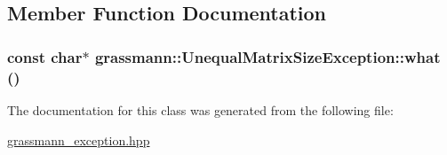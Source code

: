 \subsection{Member Function Documentation}
\hypertarget{classgrassmann_1_1UnequalMatrixSizeException_2dd3f968d0dfeecc47c8e527ad99825e}{
\subsubsection[what]{\setlength{\rightskip}{0pt plus 5cm}const char$\ast$ grassmann::UnequalMatrixSizeException::what ()}}
\label{classgrassmann_1_1UnequalMatrixSizeException_2dd3f968d0dfeecc47c8e527ad99825e}




The documentation for this class was generated from the following file:\begin{CompactItemize}
\item 
\hyperlink{grassmann__exception_8hpp}{grassmann\_\-exception.hpp}\end{CompactItemize}
